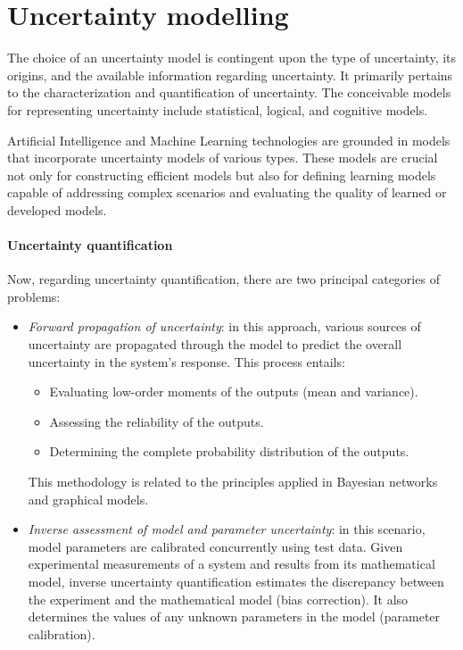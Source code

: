 \section{Uncertainty modelling}

The choice of an uncertainty model is contingent upon the type of uncertainty, its origins, and the available information regarding uncertainty. 
It primarily pertains to the characterization and quantification of uncertainty. 
The conceivable models for representing uncertainty include statistical, logical, and cognitive models.

Artificial Intelligence and Machine Learning technologies are grounded in models that incorporate uncertainty models of various types. 
These models are crucial not only for constructing efficient models but also for defining learning models capable of addressing complex scenarios and evaluating the quality of learned or developed models.

\paragraph*{Uncertainty quantification}
Now, regarding uncertainty quantification, there are two principal categories of problems:
\begin{itemize}
    \item \textit{Forward propagation of uncertainty}: in this approach, various sources of uncertainty are propagated through the model to predict the overall uncertainty in the system's response. 
        This process entails:
        \begin{itemize}
            \item Evaluating low-order moments of the outputs (mean and variance).
            \item Assessing the reliability of the outputs.
            \item Determining the complete probability distribution of the outputs. 
        \end{itemize}
        This methodology is related to the principles applied in Bayesian networks and graphical models.
    \item \textit{Inverse assessment of model and parameter uncertainty}: in this scenario, model parameters are calibrated concurrently using test data. 
        Given experimental measurements of a system and results from its mathematical model, inverse uncertainty quantification estimates the discrepancy between the experiment and the mathematical model (bias correction). 
        It also determines the values of any unknown parameters in the model (parameter calibration).
\end{itemize}

